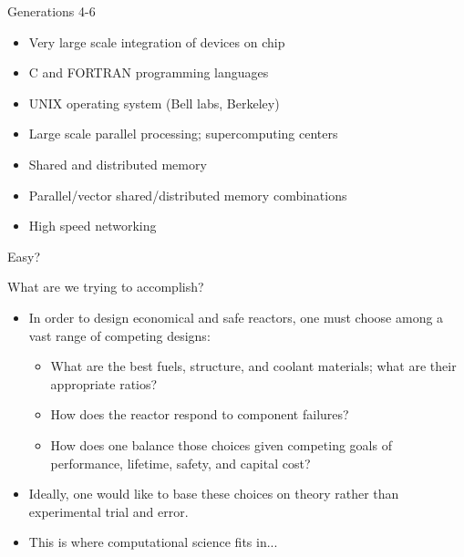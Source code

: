 \documentclass[xcolor=x11names,compress]{beamer}
\renewcommand{\(}{\begin{columns}}
\renewcommand{\)}{\end{columns}}
\newcommand{\<}[1]{\begin{column}{#1}}
\renewcommand{\>}{\end{column}}
\begin{document}
\begin{frame}{Generations 4-6}
\begin{itemize}
\item Very large scale integration of devices on chip
\item C and FORTRAN programming languages
\item UNIX operating system (Bell labs, Berkeley)
\item Large scale parallel processing; supercomputing centers
\item Shared and distributed memory
\item Parallel/vector shared/distributed memory combinations
\item High speed networking
\end{itemize}
\end{frame}

\begin{frame}{Easy?}
 \begin{figure}
   \begin{center}
   \end{center}
 \end{figure}
\end{frame}

\begin{frame}{What are we trying to accomplish?}
\begin{itemize}
\item In order to design economical and safe reactors, one must choose among a vast range of competing designs:
\begin{itemize}
\item What are the best fuels, structure, and coolant materials; what are their appropriate ratios?
\item How does the reactor respond to component failures?
\item How does one balance those choices given competing goals of performance, lifetime, safety, and capital cost?
\end{itemize}
\item Ideally, one would like to base these choices on theory rather than experimental trial and error.
\item This is where \textcolor{dgreen}{computational science} fits in...
\end{itemize}
\end{frame}
\end{document}

